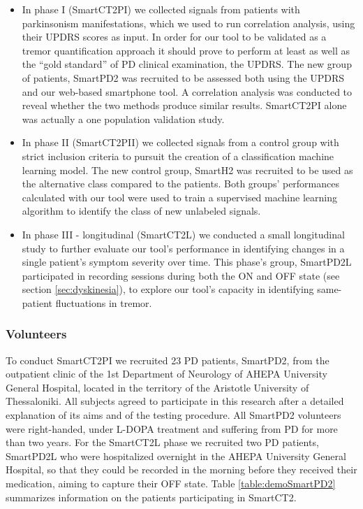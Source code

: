 \begin{itemize}
\item In phase I (\gls{SmartCT2PI}) we collected signals from patients with parkinsonism manifestations, which we used to run correlation analysis, using their \gls{UPDRS} scores as input. In order for our tool to be validated as a tremor quantification approach it should prove to perform at least as well as the ``gold standard'' of \gls{PD} clinical examination, the \gls{UPDRS}. The new group of patients, \gls{SmartPD2} was recruited to be assessed both using the \gls{UPDRS} and our web-based smartphone tool. A correlation analysis was conducted to reveal whether the two methods produce similar results. \gls{SmartCT2PI} alone was actually a one population validation study. 
\item In phase II (\gls{SmartCT2PII}) we collected signals from a control group with strict inclusion criteria to pursuit the creation of a classification machine learning model. The new control group, \gls{SmartH2} was recruited to be used as the alternative class compared to the patients. Both groups' performances calculated with our tool were used to train a supervised machine learning algorithm to identify the class of new unlabeled signals. 
\item In phase III - longitudinal (\gls{SmartCT2L}) we conducted a small longitudinal study to further evaluate our tool's performance in identifying changes in a single patient's symptom severity over time. This phase's group, \gls{SmartPD2L} participated in recording sessions during both the ON and OFF state (see section \ref{sec:dyskinesia}), to explore our tool's capacity in identifying same-patient fluctuations in tremor.
\end{itemize}

\subsubsection{Volunteers}
\label{subsubsec:smartCT2Volunteers}
To conduct \gls{SmartCT2PI} we recruited 23 \gls{PD} patients, \gls{SmartPD2}, from the outpatient clinic of the 1st Department of Neurology of AHEPA University General Hospital, located in the territory of the Aristotle University of Thessaloniki. All subjects agreed to participate in this research after a detailed explanation of its aims and of the testing procedure. All \gls{SmartPD2} volunteers were right-handed, under L-DOPA treatment and suffering from \gls{PD} for more than two years.
For the \gls{SmartCT2L} phase we recruited two \gls{PD} patients, \gls{SmartPD2L} who were hospitalized overnight in the AHEPA University General Hospital, so that they could be recorded in the morning before they received their medication, aiming to capture their OFF state. Table \ref{table:demoSmartPD2} summarizes information on the patients participating in \gls{SmartCT2}. 

